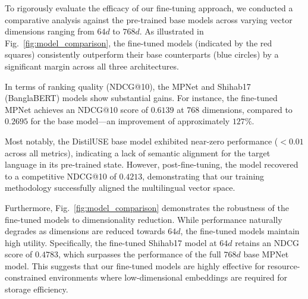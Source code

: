 \documentclass[acmsmall,screen,review]{acmart}
\begin{document}
To rigorously evaluate the efficacy of our fine-tuning approach, we conducted a comparative analysis against the pre-trained base models across varying vector dimensions ranging from $64d$ to $768d$. As illustrated in Fig.~\ref{fig:model_comparison}, the fine-tuned models (indicated by the red squares) consistently outperform their base counterparts (blue circles) by a significant margin across all three architectures.

In terms of ranking quality (NDCG@10), the MPNet and Shihab17 (BanglaBERT) models show substantial gains. For instance, the fine-tuned MPNet achieves an NDCG@10 score of $0.6139$ at 768 dimensions, compared to $0.2695$ for the base model—an improvement of approximately $127\%$. 

Most notably, the DistilUSE base model exhibited near-zero performance ($<0.01$ across all metrics), indicating a lack of semantic alignment for the target language in its pre-trained state. However, post-fine-tuning, the model recovered to a competitive NDCG@10 of $0.4213$, demonstrating that our training methodology successfully aligned the multilingual vector space.

Furthermore, Fig.~\ref{fig:model_comparison} demonstrates the robustness of the fine-tuned models to dimensionality reduction. While performance naturally degrades as dimensions are reduced towards $64d$, the fine-tuned models maintain high utility. Specifically, the fine-tuned Shihab17 model at $64d$ retains an NDCG score of $0.4783$, which surpasses the performance of the full $768d$ base MPNet model. This suggests that our fine-tuned models are highly effective for resource-constrained environments where low-dimensional embeddings are required for storage efficiency.
\end{document}
